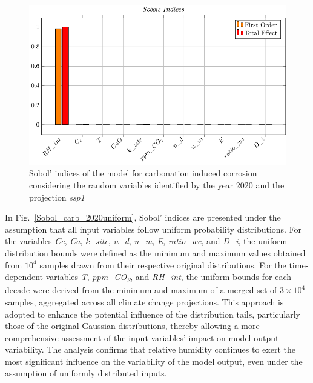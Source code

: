 \begin{figure}[H]
    \centering
    \includegraphics[width=\linewidth]{imgs/pdfs/sobols_indices/carbonation/17_sobols_2020_ssp1.pdf}
    \caption{Sobol' indices of the model for carbonation induced corrosion considering the random variables identified by the year 2020 and the projection \textit{ssp1}}\label{Sobol_carb_2020ssp1}
\end{figure}
In Fig.~\ref{Sobol_carb_2020uniform}, Sobol' indices are presented under the assumption that all input variables follow uniform probability distributions. For the variables \textit{Ce}, \textit{Ca}, \textit{k\_site}, \textit{n\_d}, \textit{n\_m}, \textit{E}, \textit{ratio\_wc}, and \textit{D\_i}, the uniform distribution bounds were defined as the minimum and maximum values obtained from $10^4$ samples drawn from their respective original distributions. For the time-dependent variables \textit{T}, \textit{ppm\_CO\textsubscript{2}}, and \textit{RH\_int}, the uniform bounds for each decade were derived from the minimum and maximum of a merged set of $3 \times 10^4$ samples, aggregated across all climate change projections. This approach is adopted to enhance the potential influence of the distribution tails, particularly those of the original Gaussian distributions, thereby allowing a more comprehensive assessment of the input variables' impact on model output variability. 
The analysis confirms that relative humidity continues to exert the most significant influence on the variability of the model output, even under the assumption of uniformly distributed inputs.
